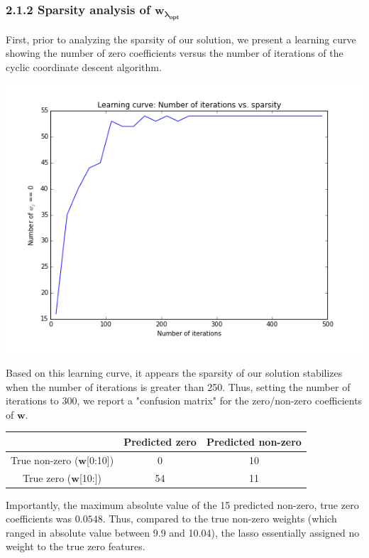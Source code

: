 \documentclass[paper=a4, fontsize=11pt]{scrartcl} %
\numberwithin{equation}{section} %
\numberwithin{figure}{section} %
\numberwithin{table}{section} %
\begin{document}
\subsubsection*{2.1.2 Sparsity analysis of $\bm{w_{\lambda_{opt}}}$}

First, prior to analyzing the sparsity of our solution, we present a learning curve showing the number of zero coefficients versus the number of iterations of the cyclic coordinate descent algorithm.\\
\begin{center} \includegraphics[scale=0.65]{./../figures/2_1_2.png} \end{center}

Based on this learning curve, it appears the sparsity of our solution stabilizes when the number of iterations is greater than 250. Thus, setting the number of iterations to 300, we report a "confusion matrix" for the zero/non-zero coefficients of $\bm{w}$.

\begin{center}
\begin{tabular}{| c | c | c |}
\hline
	& Predicted zero &  Predicted non-zero\\
\hline
True non-zero ($\bm{w}$[0:10]) &  0 &  10 \\
\hline
True zero ($\bm{w}$[10:]) & 54 & 11 \\
\hline
\end{tabular}\end{center}
Importantly, the maximum absolute value of the 15 predicted non-zero, true zero coefficients was $0.0548$. Thus, compared to the true non-zero weights (which ranged in absolute value between 9.9 and 10.04), the lasso essentially assigned no weight to the true zero features.
\end{document}
